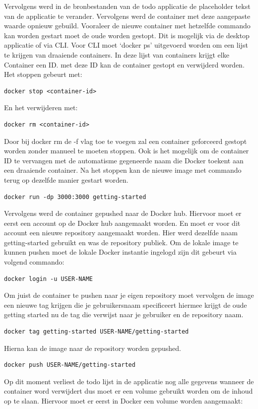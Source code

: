 Vervolgens werd in de bronbestanden van de todo applicatie de placeholder tekst van de applicatie te verander. Vervolgens werd de container met deze aangepaste waarde opnieuw gebuild. Vooraleer de nieuwe container met hetzelfde commando kan worden gestart moet de oude worden gestopt. Dit is mogelijk via de desktop applicatie of via CLI. Voor CLI moet ‘docker ps’ uitgevoerd worden om een lijst te krijgen van draaiende containers. In deze lijst van containers krijgt elke Container een ID. met deze ID kan de container gestopt en verwijderd worden.
Het stoppen gebeurt met:
\begin{verbatim}
docker stop <container-id>
\end{verbatim}
En het verwijderen met:
\begin{verbatim}
docker rm <container-id>
\end{verbatim}
Door bij docker rm de -f vlag toe te voegen zal een container geforceerd gestopt worden zonder manueel te moeten stoppen. Ook is het mogelijk om de container ID te vervangen met  de automatisme gegeneerde naam die Docker toekent aan een draaiende container.
Na het stoppen kan de nieuwe image met commando terug op dezelfde manier gestart worden.
\begin{verbatim}
docker run -dp 3000:3000 getting-started
\end{verbatim}
Vervolgens werd de container gepushed naar de Docker hub. Hiervoor moet er eerst een account op de Docker hub aangemaakt worden. En moet er voor dit account een nieuwe repository aangemaakt worden. Hier werd dezelfde naam getting-started gebruikt en was de repository publiek. Om de lokale image te kunnen pushen moet de lokale Docker instantie ingelogd zijn dit gebeurt via volgend commando:
\begin{verbatim}
docker login -u USER-NAME
\end{verbatim}
Om juist de container te pushen naar je eigen repository moet vervolgen de image een nieuwe tag krijgen die je gebruikersnaam specificeert hiermee krijgt de oude getting started nu de tag die verwijst naar je gebruiker en de repository naam.
\begin{verbatim}
docker tag getting-started USER-NAME/getting-started
\end{verbatim}
Hierna kan de image naar de repository worden gepushed.
\begin{verbatim}
docker push USER-NAME/getting-started
\end{verbatim}
Op dit moment verliest de todo lijst in de applicatie nog alle gegevens wanneer de container word verwijdert dus moet er een volume gebruikt worden om de inhoud op te slaan. Hiervoor moet er eerst in Docker een volume worden aangemaakt:
